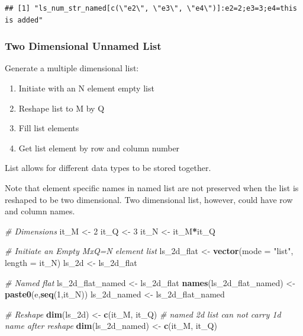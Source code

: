 \documentclass[
]{book}
\newenvironment{Shaded}{\begin{snugshade}}{\end{snugshade}}
\newcommand{\CommentTok}[1]{\textcolor[rgb]{0.56,0.35,0.01}{\textit{#1}}}
\newcommand{\DataTypeTok}[1]{\textcolor[rgb]{0.13,0.29,0.53}{#1}}
\newcommand{\DecValTok}[1]{\textcolor[rgb]{0.00,0.00,0.81}{#1}}
\newcommand{\KeywordTok}[1]{\textcolor[rgb]{0.13,0.29,0.53}{\textbf{#1}}}
\newcommand{\NormalTok}[1]{#1}
\newcommand{\OperatorTok}[1]{\textcolor[rgb]{0.81,0.36,0.00}{\textbf{#1}}}
\newcommand{\StringTok}[1]{\textcolor[rgb]{0.31,0.60,0.02}{#1}}
\providecommand{\tightlist}{%
  \setlength{\itemsep}{0pt}\setlength{\parskip}{0pt}}
\begin{document}
\begin{verbatim}
## [1] "ls_num_str_named[c(\"e2\", \"e3\", \"e4\")]:e2=2;e3=3;e4=this is added"
\end{verbatim}

\hypertarget{two-dimensional-unnamed-list}{%
\subsubsection{Two Dimensional Unnamed List}\label{two-dimensional-unnamed-list}}

Generate a multiple dimensional list:

\begin{enumerate}
\def\labelenumi{\arabic{enumi}.}
\tightlist
\item
  Initiate with an N element empty list
\item
  Reshape list to M by Q
\item
  Fill list elements
\item
  Get list element by row and column number
\end{enumerate}

List allows for different data types to be stored together.

Note that element specific names in named list are not preserved when the list is reshaped to be two dimensional. Two dimensional list, however, could have row and column names.

\begin{Shaded}
\begin{Highlighting}[]
\CommentTok{\# Dimensions}
\NormalTok{it\_M \textless{}{-}}\StringTok{ }\DecValTok{2}
\NormalTok{it\_Q \textless{}{-}}\StringTok{ }\DecValTok{3}
\NormalTok{it\_N \textless{}{-}}\StringTok{ }\NormalTok{it\_M}\OperatorTok{*}\NormalTok{it\_Q}

\CommentTok{\# Initiate an Empty MxQ=N element list}
\NormalTok{ls\_2d\_flat \textless{}{-}}\StringTok{ }\KeywordTok{vector}\NormalTok{(}\DataTypeTok{mode =} \StringTok{"list"}\NormalTok{, }\DataTypeTok{length =}\NormalTok{ it\_N)}
\NormalTok{ls\_2d \textless{}{-}}\StringTok{ }\NormalTok{ls\_2d\_flat}

\CommentTok{\# Named flat}
\NormalTok{ls\_2d\_flat\_named \textless{}{-}}\StringTok{ }\NormalTok{ls\_2d\_flat}
\KeywordTok{names}\NormalTok{(ls\_2d\_flat\_named) \textless{}{-}}\StringTok{ }\KeywordTok{paste0}\NormalTok{(}\StringTok{\textquotesingle{}e\textquotesingle{}}\NormalTok{,}\KeywordTok{seq}\NormalTok{(}\DecValTok{1}\NormalTok{,it\_N))}
\NormalTok{ls\_2d\_named \textless{}{-}}\StringTok{ }\NormalTok{ls\_2d\_flat\_named}

\CommentTok{\# Reshape}
\KeywordTok{dim}\NormalTok{(ls\_2d) \textless{}{-}}\StringTok{ }\KeywordTok{c}\NormalTok{(it\_M, it\_Q)}
\CommentTok{\# named 2d list can not carry 1d name after reshape}
\KeywordTok{dim}\NormalTok{(ls\_2d\_named) \textless{}{-}}\StringTok{ }\KeywordTok{c}\NormalTok{(it\_M, it\_Q)}
\end{Highlighting}
\end{Shaded}
\end{document}
